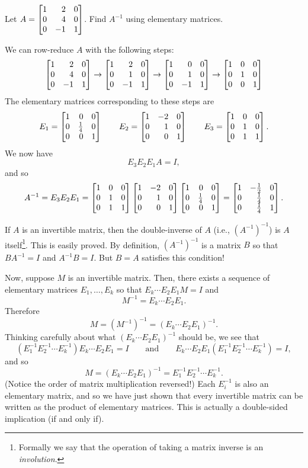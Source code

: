 \begin{example}
	Let $A=\mat{1&2&0\\0&4&0\\0&-1&1}$. Find $A^{-1}$ using elementary matrices.

	We can row-reduce $A$ with the following steps:
	\[
	    \mat{1&2&0\\0&4&0\\0&-1&1}\to \mat{1&2&0\\0&1&0\\0&-1&1}\to \mat{1&0&0\\0&1&0\\0&-1&1}\to \mat{1&0&0\\0&1&0\\0&0&1} 
	\]
	The elementary matrices corresponding to these steps are
	\[
	    E_1=\mat{1&0&0\\0&\frac{1}{4}&0\\0&0&1} \qquad E_2=\mat{1&-2&0\\0&1&0\\0&0&1}\qquad E_3=\mat{1&0&0\\0&1&0\\0&1&1}.
	\]
	We now have 
	\[
	    E_3 E_2 E_1 A = I,
	\]
	and so
	\[
	    A^{-1}=E_3 E_2 E_1 = \mat{1&0&0\\0&1&0\\0&1&1}\mat{1&-2&0\\0&1&0\\0&0&1}\mat{1&0&0\\0&\frac{1}{4}&0\\0&0&1} = \mat{1&-\frac{1}{2}&0\\ 0&\frac{1}{4}&0\\ 0&\frac{1}{4}&1}.
	\]
\end{example}


If $A$ is an invertible matrix, then the double-inverse of $A$ (i.e., $(A^{-1})^{-1}$) is $A$ itself\footnote{ Formally
we say that the operation of taking a matrix inverse is an \emph{involution}.}. This is easily proved. By definition, $(A^{-1})^{-1}$
is a matrix $B$ so that $BA^{-1}=I$ and $A^{-1}B=I$. But $B=A$ satisfies this condition! 

Now, suppose $M$ is an invertible matrix. Then, there exists a sequence of elementary matrices $E_1,\ldots, E_k$ so that
$E_k\cdots E_2E_1M=I$ and 
\[
	M^{-1}=E_k\cdots E_2E_1.
\]
Therefore 
\[
	M=(M^{-1})^{-1} = (E_k\cdots E_2E_1)^{-1}.
\]
Thinking carefully about what $(E_k\cdots E_2E_1)^{-1}$ should be, we see that 
\[
	(E_1^{-1}E_2^{-1}\cdots E_k^{-1})E_k\cdots E_2E_1=I\qquad\text{and}\qquad E_k\cdots E_2E_1(E_1^{-1}E_2^{-1}\cdots E_k^{-1})=I,
\]
and so
\[
	M=(E_k\cdots E_2E_1)^{-1}=E_1^{-1}E_2^{-1}\cdots E_k^{-1}.
\]
(Notice the order of matrix multiplication reversed!)
Each $E_i^{-1}$ is also an elementary matrix, and so we have just shown that every invertible matrix can
be written as the product of elementary matrices. This is actually a double-sided implication (if and only if).

